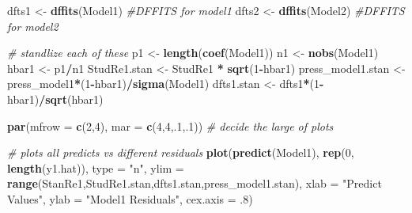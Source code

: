 \documentclass[]{article}
\newenvironment{Shaded}{\begin{snugshade}}{\end{snugshade}}
\newcommand{\KeywordTok}[1]{\textcolor[rgb]{0.13,0.29,0.53}{\textbf{#1}}}
\newcommand{\DataTypeTok}[1]{\textcolor[rgb]{0.13,0.29,0.53}{#1}}
\newcommand{\DecValTok}[1]{\textcolor[rgb]{0.00,0.00,0.81}{#1}}
\newcommand{\StringTok}[1]{\textcolor[rgb]{0.31,0.60,0.02}{#1}}
\newcommand{\CommentTok}[1]{\textcolor[rgb]{0.56,0.35,0.01}{\textit{#1}}}
\newcommand{\OperatorTok}[1]{\textcolor[rgb]{0.81,0.36,0.00}{\textbf{#1}}}
\newcommand{\NormalTok}[1]{#1}
\begin{document}
\begin{Shaded}
\begin{Highlighting}[]
\NormalTok{dfts1 <-}\StringTok{ }\KeywordTok{dffits}\NormalTok{(Model1) }\CommentTok{#DFFITS for model1}
\NormalTok{dfts2 <-}\StringTok{ }\KeywordTok{dffits}\NormalTok{(Model2) }\CommentTok{#DFFITS for model2}

\CommentTok{# standlize each of these}
\NormalTok{p1 <-}\StringTok{ }\KeywordTok{length}\NormalTok{(}\KeywordTok{coef}\NormalTok{(Model1))}
\NormalTok{n1 <-}\StringTok{ }\KeywordTok{nobs}\NormalTok{(Model1)}
\NormalTok{hbar1 <-}\StringTok{ }\NormalTok{p1}\OperatorTok{/}\NormalTok{n1}
\NormalTok{StudRe1.stan <-}\StringTok{ }\NormalTok{StudRe1 }\OperatorTok{*}\StringTok{ }\KeywordTok{sqrt}\NormalTok{(}\DecValTok{1}\OperatorTok{-}\NormalTok{hbar1)}
\NormalTok{press_model1.stan <-}\StringTok{ }\NormalTok{press_model1}\OperatorTok{*}\NormalTok{(}\DecValTok{1}\OperatorTok{-}\NormalTok{hbar1)}\OperatorTok{/}\KeywordTok{sigma}\NormalTok{(Model1)}
\NormalTok{dfts1.stan <-}\StringTok{ }\NormalTok{dfts1}\OperatorTok{*}\NormalTok{(}\DecValTok{1}\OperatorTok{-}\NormalTok{hbar1)}\OperatorTok{/}\KeywordTok{sqrt}\NormalTok{(hbar1)}

\KeywordTok{par}\NormalTok{(}\DataTypeTok{mfrow =} \KeywordTok{c}\NormalTok{(}\DecValTok{2}\NormalTok{,}\DecValTok{4}\NormalTok{), }\DataTypeTok{mar =} \KeywordTok{c}\NormalTok{(}\DecValTok{4}\NormalTok{,}\DecValTok{4}\NormalTok{,.}\DecValTok{1}\NormalTok{,.}\DecValTok{1}\NormalTok{)) }\CommentTok{# decide the large of plots}

\CommentTok{# plots all predicts vs different residuals}
\KeywordTok{plot}\NormalTok{(}\KeywordTok{predict}\NormalTok{(Model1), }\KeywordTok{rep}\NormalTok{(}\DecValTok{0}\NormalTok{, }\KeywordTok{length}\NormalTok{(y1.hat)), }\DataTypeTok{type =} \StringTok{"n"}\NormalTok{,}
     \DataTypeTok{ylim =} \KeywordTok{range}\NormalTok{(StanRe1,StudRe1.stan,dfts1.stan,press_model1.stan),}
     \DataTypeTok{xlab =} \StringTok{"Predict Values"}\NormalTok{,}
     \DataTypeTok{ylab =} \StringTok{"Model1 Residuals"}\NormalTok{,}
     \DataTypeTok{cex.axis =}\NormalTok{ .}\DecValTok{8}\NormalTok{)}


\end{Highlighting}
\end{Shaded}
\end{document}
